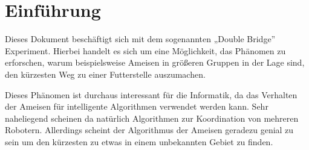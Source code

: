 
\section{Einführung}

Dieses Dokument beschäftigt sich mit dem sogenannten „Double Bridge”
Experiment. Hierbei handelt es sich um eine Möglichkeit, das Phänomen
zu erforschen, warum beispielsweise Ameisen in größeren Gruppen in der
Lage sind, den kürzesten Weg zu einer Futterstelle auszumachen.

Dieses Phänomen ist durchaus interessant für die Informatik, da das
Verhalten der Ameisen für intelligente Algorithmen verwendet werden
kann. Sehr naheliegend scheinen da natürlich Algorithmen zur
Koordination von mehreren Robotern. Allerdings scheint der Algorithmus
der Ameisen geradezu genial zu sein um den kürzesten zu etwas in einem
unbekannten Gebiet zu finden.